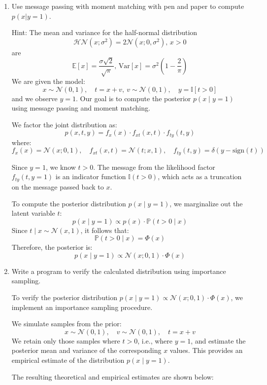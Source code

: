 \documentclass{article}
\begin{document}
\begin{enumerate}
\begin{enumerate}
\item Use message passing with moment matching with pen and paper to compute $p(x|y = 1)$.

Hint: The mean and variance for the half-normal distribution
$$\mathcal{HN}(x; \sigma^2) = 2\mathcal{N}(x; 0, \sigma^2) \text{, } x > 0$$
are
$$\mathbb{E}[x] = \frac{\sigma\sqrt{2}}{\sqrt{\pi}} \text{, } \mathrm{Var}[x] = \sigma^2\left(1 - \frac{2}{\pi}\right)$$
We are given the model:
\[
x \sim \mathcal{N}(0, 1), \quad t = x + v,\ v \sim \mathcal{N}(0, 1), \quad y = \mathbb{I}[t > 0]
\]
and we observe \( y = 1 \). Our goal is to compute the posterior \( p(x \mid y = 1) \) using message passing and moment matching.

We factor the joint distribution as:
\[
p(x, t, y) = f_x(x) \cdot f_{xt}(x, t) \cdot f_{ty}(t, y)
\]
where:
\[
f_x(x) = \mathcal{N}(x; 0, 1), \quad f_{xt}(x, t) = \mathcal{N}(t; x, 1), \quad f_{ty}(t, y) = \delta(y - \text{sign}(t))
\]

Since \( y = 1 \), we know \( t > 0 \). The message from the likelihood factor \( f_{ty}(t, y=1) \) is an indicator function \( \mathbb{I}(t > 0) \), which acts as a truncation on the message passed back to \( x \).

To compute the posterior distribution \( p(x \mid y=1) \), we marginalize out the latent variable \( t \):
\[
p(x \mid y=1) \propto p(x) \cdot \mathbb{P}(t > 0 \mid x)
\]
Since \( t \mid x \sim \mathcal{N}(x, 1) \), it follows that:
\[
\mathbb{P}(t > 0 \mid x) = \Phi(x)
\]
Therefore, the posterior is:
\[
\boxed{
p(x \mid y=1) \propto \mathcal{N}(x; 0, 1) \cdot \Phi(x)
}
\]



\item Write a program to verify the calculated distribution using importance sampling.


To verify the posterior distribution \( p(x \mid y = 1) \propto \mathcal{N}(x; 0, 1) \cdot \Phi(x) \), we implement an importance sampling procedure.

We simulate samples from the prior:
\[
x \sim \mathcal{N}(0, 1), \quad v \sim \mathcal{N}(0, 1), \quad t = x + v
\]
We retain only those samples where \( t > 0 \), i.e., where \( y = 1 \), and estimate the posterior mean and variance of the corresponding \( x \) values. This provides an empirical estimate of the distribution \( p(x \mid y = 1) \).

The resulting theoretical and empirical estimates are shown below:


\end{enumerate}
\end{enumerate}
\end{document}
